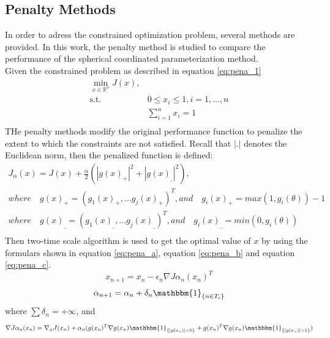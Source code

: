 \documentclass[a4paper,12pt]{article}
\begin{document}
\subsection{Penalty Methods}
In order to adress the constrained optimization problem, several methods are provided. In this work, the penalty method is studied to compare the performance of the spherical coordinated parameterization method.\\
Given the constrained problem as described in equation \ref{eq:pena_1}
\begin{equation}\label{eq:pena_1}
\begin{aligned}
\min_{x\in \mathbb{R}^n}J(x), \\
\textrm{s.t.} \quad & 0 \leq x_i \leq 1, i=1,...,n\\
              \quad & \sum_{i=1}^{n} x_i = 1\\
\end{aligned}
\end{equation}
THe penalty methods modify the original performance function to penalize the extent to which the constraints are not satisfied. Recall that $|.|$ denotes the Euclidean norm, then the penalized function is defined:\\
\begin{equation} \label{eq:pena_2}
\begin{aligned}
J_{\alpha}(x) = J(x)+\frac{\alpha}{2}(|g(x)_{+}|^2+|g(x)_{\_}|^2),\\
where \quad g(x)_{+} =(g_1(x)_{+},...g_j(x)_{+})^T, and \quad g_i(x)_{+} = max(1,g_i(\theta))-1\\
where \quad g(x)_{\_} =(g_1(x)_{\_},...g_j(x)_{\_})^T, and \quad g_i(x)_{\_} = min(0,g_i(\theta))\\
\end{aligned}
\end{equation}
Then two-time scale algorithm is used to get the optimal value of $x$ by using the formulars shown in equation \ref{eq:pena_a}, equation \ref{eq:pena_b} and equation \ref{eq:pena_c}. \\
\begin{equation} \label{eq:pena_a}
x_{n+1}=x_n-\epsilon _n \nabla J{\alpha_ n}(x_n)^T
\end{equation}
\begin{equation}\label{eq:pena_b}
\alpha_{n+1}=\alpha_n+\delta _n \mathbbm{1} _{\{n\in {T_i}\}}
\end{equation}
where $\sum \delta_n = + \infty$, and\\
\begin{equation}\label{eq:pena_c}
\nabla J{\alpha_ n}(x_n) =\nabla _x J(x_n)+\alpha_n(g(x_n)^T \nabla g(x_n) \mathbbm{1}_{\{|g(x_n)|<0\}}+g(x_n)^T \nabla g(x_n) \mathbbm{1}_{\{|g(x_n)|>1\}})
\end{equation}
\end{document}
